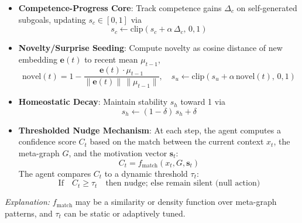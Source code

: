 \documentclass[11pt]{article}
\begin{document}
\begin{itemize}
  \item \textbf{Competence-Progress Core}: Track competence gains $\Delta_c$ on self-generated subgoals, updating $s_c\in[0,1]$ via
  \[
    s_c \leftarrow \mathrm{clip}(s_c + \alpha\,\Delta_c,\,0,1)
  \]
  \item \textbf{Novelty/Surprise Seeding}: Compute novelty as cosine distance of new embedding $\mathbf{e}(t)$ to recent mean $\mu_{t-1}$,
  \[
    \mathrm{novel}(t) = 1 - \frac{\mathbf{e}(t)\cdot\mu_{t-1}}{\|\mathbf{e}(t)\|\,\|\mu_{t-1}\|},\quad
    s_u \leftarrow \mathrm{clip}(s_u + \alpha\,\mathrm{novel}(t),\,0,1)
  \]
  \item \textbf{Homeostatic Decay}: Maintain stability $s_h$ toward 1 via
  \[
    s_h \leftarrow (1-\delta)\,s_h + \delta
  \]
  \item \textbf{Thresholded Nudge Mechanism}: At each step, the agent computes a confidence score $C_t$ based on the match between the current context $x_t$, the meta-graph $G$, and the motivation vector $\mathbf{s}_t$:
  \[
    C_t = f_\mathrm{match}(x_t, G, \mathbf{s}_t)
  \]
  The agent compares $C_t$ to a dynamic threshold $\tau_t$:
  \[
    \text{If}\quad C_t \geq \tau_t\quad \text{then nudge; else remain silent (null action)}
  \]
\end{itemize}
  \textit{Explanation:} $f_\mathrm{match}$ may be a similarity or density function over meta-graph patterns, and $\tau_t$ can be static or adaptively tuned.
\end{document}

